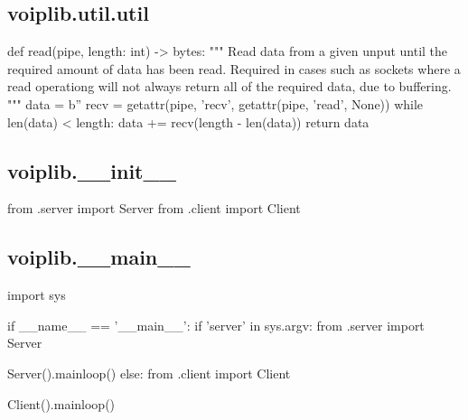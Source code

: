 \subsection{voiplib.util.util}
\begin{pythoncode}
def read(pipe, length: int) -> bytes:
    """
    Read data from a given unput until the required amount of data has been
    read. Required in cases such as sockets where a read operationg will not
    always return all of the required data, due to buffering.
    """
    data = b''
    recv = getattr(pipe, 'recv', getattr(pipe, 'read', None))
    while len(data) < length:
        data += recv(length - len(data))
    return data
\end{pythoncode}
\subsection{voiplib.\_\_init\_\_}
\begin{pythoncode}
from .server import Server
from .client import Client
\end{pythoncode}
\subsection{voiplib.\_\_main\_\_}
\begin{pythoncode}
import sys

if __name__ == '__main__':
    if 'server' in sys.argv:
        from .server import Server

        Server().mainloop()
    else:
        from .client import Client

        Client().mainloop()
\end{pythoncode}
